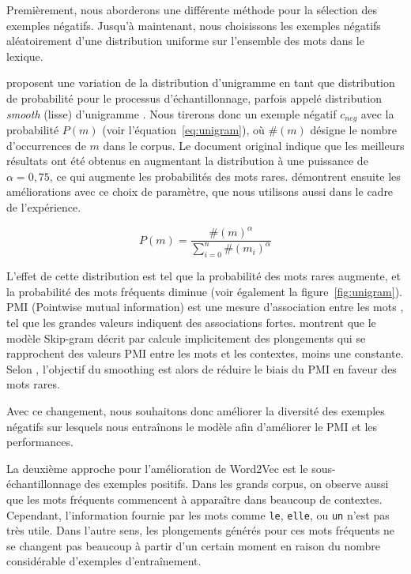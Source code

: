 \documentclass[12pt]{article}
\begin{document}
Premièrement, nous aborderons une différente méthode pour la sélection des exemples négatifs. Jusqu'à maintenant, nous choisissons les exemples négatifs aléatoirement d'une distribution uniforme sur l'ensemble des mots dans le lexique. 

\cite{DBLP:conf/nips/MikolovSCCD13} proposent une variation de la distribution d'unigramme en tant que distribution de probabilité pour le processus d'échantillonnage, parfois appelé distribution \textit{smooth} (lisse) d'unigramme \citep{levy2015improving}. Nous tirerons donc un exemple négatif $c_{neg}$ avec la probabilité $P(m)$ (voir l'équation~\ref{eq:unigram}), où $\#(m)$ désigne le nombre d'occurrences de $m$ dans le corpus. Le document original indique que les meilleurs résultats ont été obtenus en augmentant la distribution à une puissance de $\alpha = 0{,}75$, ce qui augmente les probabilités des mots rares. \cite{levy2015improving} démontrent ensuite les améliorations avec ce choix de paramètre, que nous utilisons aussi dans le cadre de l'expérience.

\begin{equation}\label{eq:unigram}
P(m) = \frac{\#(m)^{\alpha}}{\sum_{i=0}^n \#(m_i)^{\alpha}}
\end{equation}

L'effet de cette distribution est tel que la probabilité des mots rares augmente, et la probabilité des mots fréquents diminue (voir également la figure~\ref{fig:unigram}). PMI (Pointwise mutual information) est une mesure d'association entre les mots \citep{jurafsky2000speech}, tel que les grandes valeurs indiquent des associations fortes. \cite{levy2014neural} montrent que le modèle Skip-gram décrit par \cite{DBLP:conf/nips/MikolovSCCD13} calcule implicitement des plongements qui se rapprochent des valeurs PMI entre les mots et les contextes, moins une constante. Selon \cite{levy2015improving}, l'objectif du smoothing est alors de réduire le biais du PMI en faveur des mots rares. 

Avec ce changement, nous souhaitons donc améliorer la diversité des exemples négatifs sur lesquels nous entraînons le modèle afin d'améliorer le PMI et les performances.

La deuxième approche pour l'amélioration de Word2Vec est le sous-échantillonnage des exemples positifs. Dans les grands corpus, on observe aussi que les mots fréquents commencent à apparaître dans beaucoup de contextes. Cependant, l'information fournie par les mots comme \texttt{le}, \texttt{elle}, ou \texttt{un} n'est pas très utile. Dans l'autre sens, les plongements générés pour ces mots fréquents ne se changent pas beaucoup à partir d'un certain moment en raison du nombre considérable d'exemples d'entraînement. 
\end{document}
